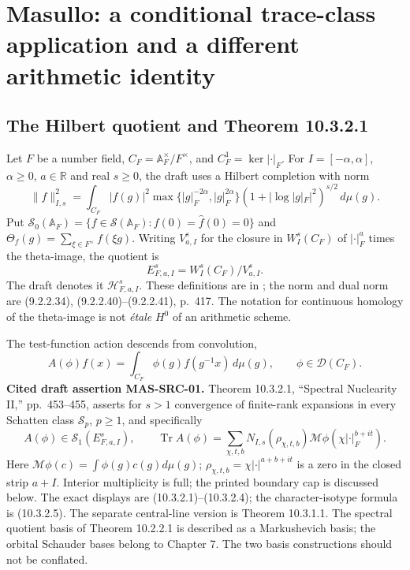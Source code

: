 \documentclass[11pt,a4paper]{article}
\newcommand{\Tr}{\operatorname{Tr}}
\newcommand{\Sone}{\mathcal S_1}
\newcommand{\M}{\mathcal M}
\newcommand{\R}{\mathbb R}
\newcommand{\A}{\mathbb A}
\newcommand{\cD}{\mathcal D}
\begin{document}
\section{Masullo: a conditional trace-class application and a different arithmetic identity}
\subsection{The Hilbert quotient and Theorem 10.3.2.1}
Let $F$ be a number field, $C_F=\A_F^\times/F^\times$, and $C_F^1=\ker|\cdot|_F$. For $I=[-\alpha,\alpha]$, $\alpha\ge0$, $a\in\R$ and real $s\ge0$, the draft uses a Hilbert completion with norm
\begin{equation}\label{eq:masnorm}
 \|f\|_{I,s}^2=\int_{C_F}|f(g)|^2
 \max\{|g|_F^{-2\alpha},|g|_F^{2\alpha}\}
 (1+|\log|g|_F|^2)^{s/2}\,d\mu(g).
\end{equation}
Put $\mathcal S_0(\A_F)=\{f\in\mathcal S(\A_F):f(0)=\widehat f(0)=0\}$ and $\Theta_f(g)=\sum_{\xi\in F^\times}f(\xi g)$. Writing $V^s_{a,I}$ for the closure in $W_I^s(C_F)$ of $|\cdot|_F^a$ times the theta-image, the quotient is
\[
 E^s_{F,a,I}=W_I^s(C_F)/V^s_{a,I}.
\]
The draft denotes it $\mathcal H^s_{F,a,I}$. These definitions are in \cite[\S1.1.3; Definition 10.1.1.1; (10.2.2.1)]{masullo}; the norm and dual norm are (9.2.2.34), (9.2.2.40)--(9.2.2.41), p.~417. The notation for continuous homology of the theta-image is not \emph{\'etale} $H^0$ of an arithmetic scheme.

The test-function action descends from convolution,
\[
 A(\phi)f(x)=\int_{C_F}\phi(g)f(g^{-1}x)\,d\mu(g),\qquad \phi\in\cD(C_F).
\]
\textbf{Cited draft assertion MAS-SRC-01.} Theorem 10.3.2.1, ``Spectral Nuclearity II,'' pp.~453--455, asserts for $s>1$ convergence of finite-rank expansions in every Schatten class $\mathcal S_p$, $p\ge1$, and specifically
\[
 A(\phi)\in\Sone(E^s_{F,a,I}),\qquad
 \Tr A(\phi)=\sum_{\chi,t,b}N_{I,s}(\rho_{\chi,t,b})
 \M\phi(\chi|\cdot|_F^{b+it}).
\]
Here $\M\phi(c)=\int\phi(g)c(g)d\mu(g)$; $\rho_{\chi,t,b}=\chi|\cdot|^{a+b+it}$ is a zero in the closed strip $a+I$. Interior multiplicity is full; the printed boundary cap is discussed below. The exact displays are (10.3.2.1)--(10.3.2.4); the character-isotype formula is (10.3.2.5). The separate central-line version is Theorem 10.3.1.1. The spectral quotient basis of Theorem 10.2.2.1 is described as a Markushevich basis; the orbital Schauder bases belong to Chapter 7. The two basis constructions should not be conflated.
\end{document}
